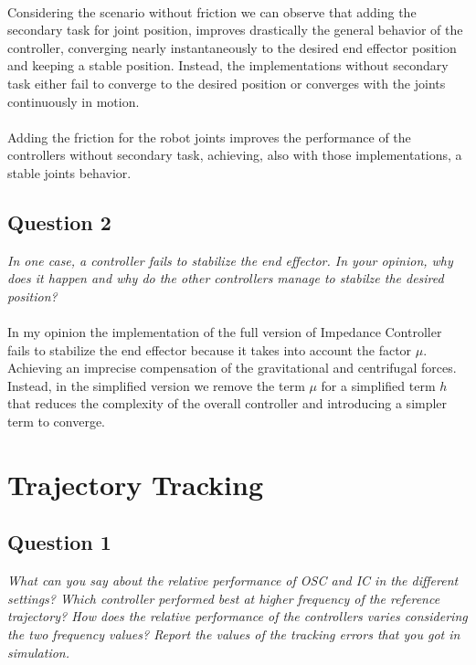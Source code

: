 \documentclass[12pt]{article}
\begin{document}
\paragraph*{}
Considering the scenario without friction we can observe that adding the secondary task for joint position, improves drastically the general behavior of the controller,
converging nearly instantaneously to the desired end effector position and keeping a stable position.
Instead, the implementations without secondary task either fail to converge to the desired position or converges with the joints continuously in motion.

\paragraph*{}
Adding the friction for the robot joints improves the performance of the controllers without secondary task, achieving, also with those implementations, a stable joints behavior.

\subsection*{Question 2}
\textit{In one case, a controller fails to stabilize the end effector. In your opinion, why does it happen and why do the other controllers manage to stabilze the desired position?}

\paragraph*{}
In my opinion the implementation of the full version of Impedance Controller fails to stabilize the end effector because it takes into account the factor \(\mu\). Achieving an imprecise compensation of the 
gravitational and centrifugal forces. Instead, in the simplified version we remove the term \(\mu\) for a simplified term \(h\) that reduces the complexity of
the overall controller and introducing a simpler term to converge.


\section*{Trajectory Tracking}
 
\subsection*{Question 1}
\textit{
    What can you say about the relative performance of OSC and IC in the different settings? 
    Which controller performed best at higher frequency of the reference trajectory? 
    How does the relative performance of the controllers varies considering the two frequency values? 
    Report the values of the tracking errors that you got in simulation.
}
\end{document}
